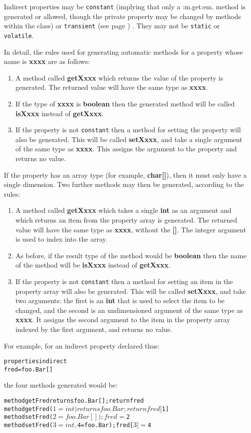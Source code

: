 Indirect properties may be \texttt{constant} (implying that only
a :m.get:em. method is generated or allowed, though the private property
may be changed by methods within the class)
or  \texttt{transient} (see page \pageref{refpropmod}) .
They may not be \texttt{static} or \texttt{volatile}.
 
In detail, the rules used for generating automatic methods for a
property whose name is \textbf{xxxx} are as follows:
\begin{enumerate}
\item A method called \textbf{getXxxx} which returns the value of the
property is generated.  The returned value will have the same type
as \textbf{xxxx}.
\item If the type of \textbf{xxxx} is \textbf{boolean} then the generated
method will be called \textbf{isXxxx} instead of \textbf{getXxxx}.
\item If the property is not \texttt{constant} then a method for setting the
property will also be generated.  This will be called \textbf{setXxxx},
and take a single argument of the same type as \textbf{xxxx}.  This
assigns the argument to the property and returns no value.
\end{enumerate}
 
If the property has an array type (for example, \textbf{char[]}),
then it must only have a single dimension.
Two further methods may then be generated, according to the rules:
\begin{enumerate}
\item A method called \textbf{getXxxx} which takes a single \textbf{int}
as an argument and which returns an item from the property array is
generated. The returned value will have the same type as \textbf{xxxx},
without the \textbf{[]}.  The integer argument is used to
index into the array.
\item As before, if the result type of the method would be \textbf{boolean}
then the name of the method will be \textbf{isXxxx} instead
of \textbf{getXxxx}.
\item If the property is not \texttt{constant} then a method for setting an
item in the property array will also be generated.
This will be called \textbf{setXxxx}, and take two arguments: the
first is an \textbf{int} that is used to select the item to be
changed, and the second is an undimensioned argument of the same type
as \textbf{xxxx}.  It assigns the second argument to the item in the
property array indexed by the first argument, and returns no value.
\end{enumerate}
 For example, for an indirect property declared thus:
\begin{alltt}
properties indirect
  fred=foo.Bar[]
\end{alltt}
the four methods generated would be:
\begin{alltt}
method getFred returns foo.Bar[]; return fred
method getFred($1=int) returns foo.Bar; return fred[$1]
method setFred($2=foo.Bar[]); fred=$2
method setFred($3=int, $4=foo.Bar); fred[$3]=$4
\end{alltt}
 
